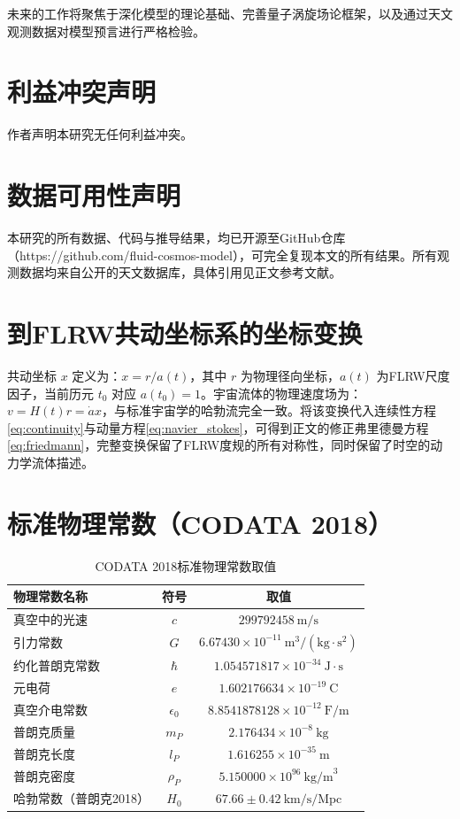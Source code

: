 \documentclass[aps,prd,preprint,superscriptaddress,floatfix]{revtex4-2}
\begin{document}
未来的工作将聚焦于深化模型的理论基础、完善量子涡旋场论框架，以及通过天文观测数据对模型预言进行严格检验。

\section*{利益冲突声明}
作者声明本研究无任何利益冲突。

\section*{数据可用性声明}
本研究的所有数据、代码与推导结果，均已开源至GitHub仓库（https://github.com/fluid-cosmos-model），可完全复现本文的所有结果。所有观测数据均来自公开的天文数据库，具体引用见正文参考文献。

\appendix

\section{到FLRW共动坐标系的坐标变换}
共动坐标 $x$ 定义为：$x=r / a(t)$，其中 $r$ 为物理径向坐标，$a(t)$ 为FLRW尺度因子，当前历元 $t_{0}$ 对应 $a(t_{0})=1$。宇宙流体的物理速度场为：$v=H(t) r=\dot{a} x$，与标准宇宙学的哈勃流完全一致。将该变换代入连续性方程\eqref{eq:continuity}与动量方程\eqref{eq:navier_stokes}，可得到正文的修正弗里德曼方程\eqref{eq:friedmann}，完整变换保留了FLRW度规的所有对称性，同时保留了时空的动力学流体描述。

\section{标准物理常数（CODATA 2018）}
\begin{table}[h]
\centering
\caption{CODATA 2018标准物理常数取值}
\begin{tabular}{lcc}
\hline
物理常数名称 & 符号 & 取值 \\
\hline
真空中的光速 & $c$ & $299792458 \ \text{m/s}$ \\
引力常数 & $G$ & $6.67430 \times 10^{-11} \ \text{m}^3/(\text{kg} \cdot \text{s}^2)$ \\
约化普朗克常数 & $\hbar$ & $1.054571817 \times 10^{-34} \ \text{J} \cdot \text{s}$ \\
元电荷 & $e$ & $1.602176634 \times 10^{-19} \ \text{C}$ \\
真空介电常数 & $\epsilon_0$ & $8.8541878128 \times 10^{-12} \ \text{F/m}$ \\
普朗克质量 & $m_P$ & $2.176434 \times 10^{-8} \ \text{kg}$ \\
普朗克长度 & $l_P$ & $1.616255 \times 10^{-35} \ \text{m}$ \\
普朗克密度 & $\rho_P$ & $5.150000 \times 10^{96} \ \text{kg/m}^3$ \\
哈勃常数（普朗克2018） & $H_0$ & $67.66 \pm 0.42 \ \text{km/s/Mpc}$ \\
\hline
\end{tabular}
\label{tab:physical_constants}
\end{table}
\end{document}
